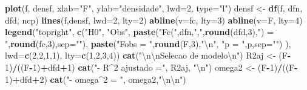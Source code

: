 \documentclass[]{article}
\newenvironment{Shaded}{\begin{snugshade}}{\end{snugshade}}
\newcommand{\KeywordTok}[1]{\textcolor[rgb]{0.13,0.29,0.53}{\textbf{#1}}}
\newcommand{\DataTypeTok}[1]{\textcolor[rgb]{0.13,0.29,0.53}{#1}}
\newcommand{\DecValTok}[1]{\textcolor[rgb]{0.00,0.00,0.81}{#1}}
\newcommand{\CharTok}[1]{\textcolor[rgb]{0.31,0.60,0.02}{#1}}
\newcommand{\StringTok}[1]{\textcolor[rgb]{0.31,0.60,0.02}{#1}}
\newcommand{\OperatorTok}[1]{\textcolor[rgb]{0.81,0.36,0.00}{\textbf{#1}}}
\newcommand{\NormalTok}[1]{#1}
\begin{document}
\begin{Shaded}
\begin{Highlighting}[]
{{\KeywordTok{plot}\NormalTok{(f, densf, }\DataTypeTok{xlab=}\StringTok{"F"}\NormalTok{, }\DataTypeTok{ylab=}\StringTok{"densidade"}\NormalTok{, }\DataTypeTok{lwd=}\DecValTok{2}\NormalTok{, }\DataTypeTok{type=}\StringTok{"l"}\NormalTok{)}
\NormalTok{densf <-}\StringTok{ }\KeywordTok{df}\NormalTok{(f, dfn, dfd, ncp)}
\KeywordTok{lines}\NormalTok{(f,densf, }\DataTypeTok{lwd=}\DecValTok{2}\NormalTok{, }\DataTypeTok{lty=}\DecValTok{2}\NormalTok{)}
\KeywordTok{abline}\NormalTok{(}\DataTypeTok{v=}\NormalTok{fc, }\DataTypeTok{lty=}\DecValTok{3}\NormalTok{)}
\KeywordTok{abline}\NormalTok{(}\DataTypeTok{v=}\NormalTok{F, }\DataTypeTok{lty=}\DecValTok{4}\NormalTok{)}
\KeywordTok{legend}\NormalTok{(}\StringTok{"topright"}\NormalTok{,}
       \KeywordTok{c}\NormalTok{(}\StringTok{"H0"}\NormalTok{, }\StringTok{"Obs"}\NormalTok{, }
         \KeywordTok{paste}\NormalTok{(}\StringTok{"Fc("}\NormalTok{,dfn,}\StringTok{","}\NormalTok{,}\KeywordTok{round}\NormalTok{(dfd,}\DecValTok{3}\NormalTok{),}\StringTok{") = "}\NormalTok{,}\KeywordTok{round}\NormalTok{(fc,}\DecValTok{3}\NormalTok{),}\DataTypeTok{sep=}\StringTok{""}\NormalTok{), }
         \KeywordTok{paste}\NormalTok{(}\StringTok{"Fobs = "}\NormalTok{,}\KeywordTok{round}\NormalTok{(F,}\DecValTok{3}\NormalTok{),}\StringTok{"}\CharTok{\textbackslash{}n}\StringTok{"}\NormalTok{,}
               \StringTok{"p = "}\NormalTok{,p,}\DataTypeTok{sep=}\StringTok{""}\NormalTok{) }
\NormalTok{         ), }
       \DataTypeTok{lwd=}\KeywordTok{c}\NormalTok{(}\DecValTok{2}\NormalTok{,}\DecValTok{2}\NormalTok{,}\DecValTok{1}\NormalTok{,}\DecValTok{1}\NormalTok{), }\DataTypeTok{lty=}\KeywordTok{c}\NormalTok{(}\DecValTok{1}\NormalTok{,}\DecValTok{2}\NormalTok{,}\DecValTok{3}\NormalTok{,}\DecValTok{4}\NormalTok{))}
\KeywordTok{cat}\NormalTok{(}\StringTok{"}\CharTok{\textbackslash{}n\textbackslash{}n}\StringTok{Selecao de modelo}\CharTok{\textbackslash{}n}\StringTok{"}\NormalTok{)}
\NormalTok{R2aj <-}\StringTok{ }\NormalTok{(F}\OperatorTok{-}\DecValTok{1}\NormalTok{)}\OperatorTok{/}\NormalTok{((F}\OperatorTok{-}\DecValTok{1}\NormalTok{)}\OperatorTok{+}\NormalTok{dfd}\OperatorTok{+}\DecValTok{1}\NormalTok{)}
\KeywordTok{cat}\NormalTok{(}\StringTok{"- R^2 ajustado ="}\NormalTok{, R2aj, }\StringTok{"}\CharTok{\textbackslash{}n}\StringTok{"}\NormalTok{)}
\NormalTok{omega2 <-}\StringTok{ }\NormalTok{(F}\OperatorTok{-}\DecValTok{1}\NormalTok{)}\OperatorTok{/}\NormalTok{((F}\OperatorTok{-}\DecValTok{1}\NormalTok{)}\OperatorTok{+}\NormalTok{dfd}\OperatorTok{+}\DecValTok{2}\NormalTok{)}
\KeywordTok{cat}\NormalTok{(}\StringTok{"- omega^2 = "}\NormalTok{, omega2,}\StringTok{"}\CharTok{\textbackslash{}n\textbackslash{}n}\StringTok{"}\NormalTok{)}
}}
\end{Highlighting}
\end{Shaded}
\end{document}
